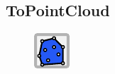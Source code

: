\documentclass{ol-softwaremanual}
\begin{document}
\subsection{ToPointCloud}
\begin{figure}[h]
    \centering
    \includegraphics[width = .5\textwidth]{figures/Icons/TOPOINTLCOUD.pdf}
\end{figure}

% 
\end{document}
